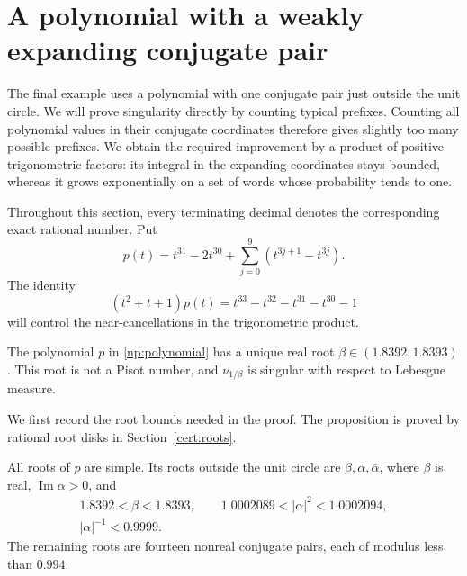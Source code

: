 \section{A polynomial with a weakly expanding conjugate pair}
\label{np:section}

The final example uses a polynomial with one conjugate pair just outside the
unit circle. We will prove singularity directly by counting typical prefixes.
Counting all polynomial values in their conjugate coordinates
therefore gives slightly too many possible prefixes. We obtain the required
improvement by a product of positive trigonometric factors: its integral in the expanding
coordinates stays bounded, whereas it grows exponentially on a set of words
whose probability tends to one.

Throughout this section, every terminating decimal denotes the corresponding
exact rational number. Put
\begin{equation}
 p(t)=t^{31}-2t^{30}+\sum_{j=0}^{9}(t^{3j+1}-t^{3j}).
 \label{np:polynomial}
\end{equation}
The identity
\begin{equation}
 (t^2+t+1)p(t)=t^{33}-t^{32}-t^{31}-t^{30}-1
 \label{np:relation}
\end{equation}
will control the near-cancellations in the trigonometric product.

\begin{theorem}\label{np:main}
The polynomial \(p\) in \eqref{np:polynomial} has a unique real root
\(\beta\in(1.8392,1.8393)\). This root is not a Pisot number, and
\(\nu_{1/\beta}\) is singular with respect to Lebesgue measure.
\end{theorem}

We first record the root bounds needed in the proof. The proposition is
proved by rational root disks in Section~\ref{cert:roots}.

\begin{proposition}\label{np:roots}\label{np:root-data}
All roots of \(p\) are simple. Its roots outside the unit circle are
\(\beta,\alpha,\overline\alpha\), where \(\beta\) is real,
\(\operatorname{Im}\alpha>0\), and
\begin{equation}
 \begin{gathered}
  1.8392<\beta<1.8393,\qquad
  1.0002089<|\alpha|^2<1.0002094,\\
  |\alpha|^{-1}<0.9999.
 \end{gathered}
 \label{np:root-bounds}
\end{equation}
The remaining roots are fourteen nonreal conjugate pairs, each of modulus
less than \(0.994\).
\end{proposition}

